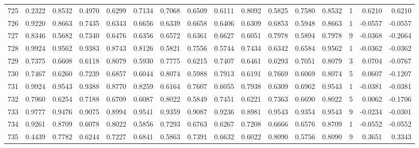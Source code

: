 \begin{tabular}{lrrrrrrrrrrrrrrr}
725 &      0.2322 &  0.8532 &  0.4970 &  0.6299 &  0.7134 &  0.7068 &  0.6509 &  0.6111 &  0.8092 &  0.5825 &   0.7580 &     0.8532 &      1 &                    0.6210 &                     0.6210 \\
726 &      0.9220 &  0.8663 &  0.7435 &  0.6343 &  0.6656 &  0.6339 &  0.6658 &  0.6406 &  0.6309 &  0.6853 &   0.5948 &     0.8663 &      1 &                   -0.0557 &                    -0.0557 \\
727 &      0.8346 &  0.5682 &  0.7340 &  0.6476 &  0.6356 &  0.6572 &  0.6361 &  0.6627 &  0.6051 &  0.7978 &   0.5894 &     0.7978 &      9 &                   -0.0368 &                    -0.2664 \\
728 &      0.9924 &  0.9562 &  0.9383 &  0.8743 &  0.8126 &  0.5821 &  0.7556 &  0.5744 &  0.7434 &  0.6342 &   0.6584 &     0.9562 &      1 &                   -0.0362 &                    -0.0362 \\
729 &      0.7375 &  0.6608 &  0.6118 &  0.8079 &  0.5930 &  0.7775 &  0.6215 &  0.7407 &  0.6461 &  0.6293 &   0.7051 &     0.8079 &      3 &                    0.0704 &                    -0.0767 \\
730 &      0.7467 &  0.6260 &  0.7239 &  0.6857 &  0.6044 &  0.8074 &  0.5988 &  0.7913 &  0.6191 &  0.7669 &   0.6069 &     0.8074 &      5 &                    0.0607 &                    -0.1207 \\
731 &      0.9924 &  0.9543 &  0.9388 &  0.8770 &  0.8259 &  0.6164 &  0.7607 &  0.6055 &  0.7938 &  0.6309 &   0.6962 &     0.9543 &      1 &                   -0.0381 &                    -0.0381 \\
732 &      0.7960 &  0.6254 &  0.7188 &  0.6709 &  0.6087 &  0.8022 &  0.5849 &  0.7451 &  0.6221 &  0.7363 &   0.6690 &     0.8022 &      5 &                    0.0062 &                    -0.1706 \\
733 &      0.9777 &  0.9476 &  0.9075 &  0.8994 &  0.9541 &  0.9359 &  0.9087 &  0.9236 &  0.8981 &  0.9543 &   0.9354 &     0.9543 &      9 &                   -0.0234 &                    -0.0301 \\
734 &      0.9261 &  0.8709 &  0.6078 &  0.8022 &  0.5856 &  0.7293 &  0.6763 &  0.6267 &  0.7208 &  0.6666 &   0.6576 &     0.8709 &      1 &                   -0.0552 &                    -0.0552 \\
735 &      0.4439 &  0.7782 &  0.6244 &  0.7227 &  0.6841 &  0.5863 &  0.7391 &  0.6632 &  0.6022 &  0.8090 &   0.5756 &     0.8090 &      9 &                    0.3651 &                     0.3343 \\

\end{tabular}
